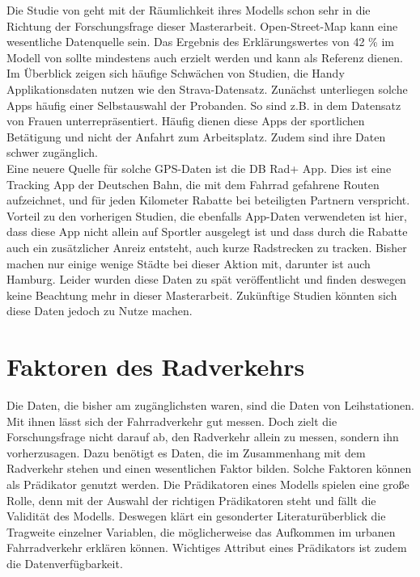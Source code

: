 \documentclass[a4paper,12pt]{thesis}
\begin{document}
Die Studie von \cite{Alattar2021} geht mit der Räumlichkeit ihres Modells schon sehr in die Richtung der Forschungsfrage dieser Masterarbeit. Open-Street-Map kann eine wesentliche Datenquelle sein. Das Ergebnis des Erklärungswertes von 42 \% im Modell von \cite{Alattar2021} sollte mindestens auch erzielt werden und kann als Referenz dienen.\\
Im Überblick zeigen sich häufige Schwächen von Studien, die Handy Applikationsdaten nutzen wie den Strava-Datensatz. Zunächst unterliegen solche Apps häufig einer Selbstauswahl der Probanden. So sind z.B. in dem Datensatz von \cite{Alattar2021} Frauen unterrepräsentiert. Häufig dienen diese Apps der sportlichen Betätigung und nicht der Anfahrt zum Arbeitsplatz. Zudem sind ihre Daten schwer zugänglich.\\
Eine neuere Quelle für solche GPS-Daten ist die DB Rad+ App. Dies ist eine Tracking App der Deutschen Bahn, die mit dem Fahrrad gefahrene Routen aufzeichnet, und für jeden Kilometer Rabatte bei beteiligten Partnern verspricht. Vorteil zu den vorherigen Studien, die ebenfalls App-Daten verwendeten ist hier, dass diese App nicht allein auf Sportler ausgelegt ist und dass durch die Rabatte auch ein zusätzlicher Anreiz entsteht, auch kurze Radstrecken zu tracken. Bisher machen nur einige wenige Städte bei dieser Aktion mit, darunter ist auch Hamburg. Leider wurden diese Daten zu spät veröffentlicht und finden deswegen keine Beachtung mehr in dieser Masterarbeit. Zukünftige Studien könnten sich diese Daten jedoch zu Nutze machen.


\section{Faktoren des Radverkehrs}

Die Daten, die bisher am zugänglichsten waren, sind die Daten von Leihstationen. Mit ihnen lässt sich der Fahrradverkehr gut messen. Doch zielt die Forschungsfrage nicht darauf ab, den Radverkehr allein zu messen, sondern ihn vorherzusagen. Dazu benötigt es Daten, die im Zusammenhang mit dem Radverkehr stehen und einen wesentlichen Faktor bilden. Solche Faktoren können als Prädikator genutzt werden. Die Prädikatoren eines Modells spielen eine große Rolle, denn mit der Auswahl der richtigen Prädikatoren steht und fällt die Validität des Modells. Deswegen klärt ein gesonderter Literaturüberblick die Tragweite einzelner Variablen, die möglicherweise das Aufkommen im urbanen Fahrradverkehr erklären können. Wichtiges Attribut eines Prädikators ist zudem die Datenverfügbarkeit. 
\end{document}
